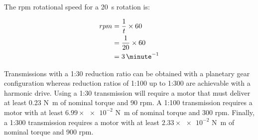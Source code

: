The \ac{rpm} rotational speed for a \SI{20}{\second} rotation is:

\begin{align}
  \label{eq:solar-panel-deployment-rpm}
  rpm &= \frac{1}{t} \times 60\\
      &= \frac{1}{20} \times 60\\
      &= 3\,{\minute^{-1}}
\end{align}

Transmissions with a 1:30 reduction ratio can be obtained with a planetary gear configuration whereas reduction ratios of 1:100 up to 1:300 are achievable with a harmonic drive. Using a 1:30 transmission will require a motor that must deliver at least 0.23 \si{\newton\meter} of nominal torque and 90 \ac{rpm}. A 1:100 transmission requires a motor with at least $6.99\times\num{e-2}$ \si{\newton\meter} of nominal torque and 300 \ac{rpm}. Finally, a 1:300 transmission requires a motor with at least $2.33\times\num{e-2}$ \si{\newton\meter} of nominal torque and 900 \ac{rpm}.

